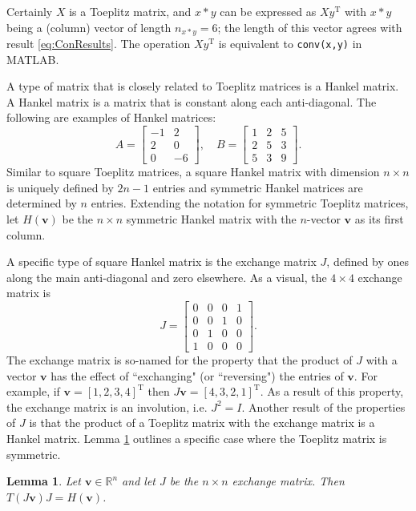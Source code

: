 \documentclass[12pt,notitlepage]{report}
\newcommand{\trans}{\mathrm{T}}	%
\newtheorem{lemma}{Lemma}[section]
\begin{document}
Certainly $X$ is a Toeplitz matrix, and $x*y$ can be expressed as $Xy^\trans$ with $x*y$ being a (column) vector of length $n_{x*y} = 6$; the length of this vector agrees with result \eqref{eq:ConResults}. The operation $Xy^\trans$ is equivalent to \texttt{conv(x,y)} in MATLAB. \par 
A type of matrix that is closely related to Toeplitz matrices is a Hankel matrix. A Hankel matrix is a matrix that is constant along each anti-diagonal. The following are examples of Hankel matrices:
\[A = \begin{bmatrix}
-1 & 2 \\
2 & 0 \\
0 & -6
\end{bmatrix}, \quad 
B = \begin{bmatrix}
1 & 2 & 5 \\
2 & 5 & 3 \\
5 & 3 & 9
\end{bmatrix}.\]
Similar to square Toeplitz matrices, a square Hankel matrix with dimension $n \times n$ is uniquely defined by $2n -1$ entries and symmetric Hankel matrices are determined by $n$ entries. Extending the notation for symmetric Toeplitz matrices, let $H(\mathbf{v})$ be the $n \times n$ symmetric Hankel matrix with the $n$-vector $\mathbf{v}$ as its first column. \par
A specific type of square Hankel matrix is the exchange matrix $J$, defined by ones along the main anti-diagonal and zero elsewhere. As a visual, the $4 \times 4$ exchange matrix is
\[J = \begin{bmatrix}
0 & 0 & 0 & 1 \\
0 & 0 & 1 & 0 \\
0 & 1 & 0 & 0 \\
1 & 0  & 0 & 0
\end{bmatrix}.\]
The exchange matrix is so-named for the property that the product of $J$ with a vector $\mathbf{v}$ has the effect of ``exchanging" (or ``reversing") the entries of $\mathbf{v}$. For example, if $\mathbf{v} = [1,2,3,4]^\trans$ then $J\mathbf{v} = [4,3,2,1]^\trans$. As a result of this property, the exchange matrix is an involution, i.e. $J^2 = I$. Another result of the properties of $J$ is that the product of a Toeplitz matrix with the exchange matrix is a Hankel matrix. Lemma \ref{lem:TJ = H} outlines a specific case where the Toeplitz matrix is symmetric.
\begin{lemma}
\label{lem:TJ = H}
Let $\mathbf{v} \in \mathbb{R}^n$ and let $J$ be the $n \times n$ exchange matrix. Then $T(J\mathbf{v})J = H(\mathbf{v})$.
\end{lemma}
\end{document}
